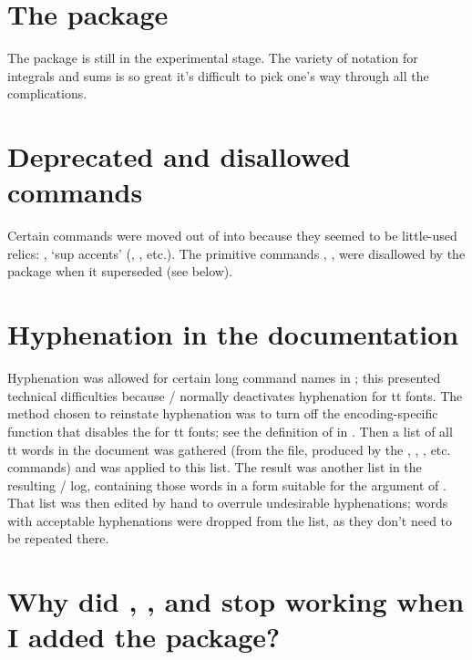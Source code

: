 \documentclass{amsdtx}
\begin{document}
\section{The  package}

The  package is still in the experimental stage. The
variety of notation for integrals and sums is so great it's difficult to
pick one's way through all the complications.

\section{Deprecated and disallowed commands}

Certain commands were moved out of  into 
because they seemed to be little-used relics:
, `sup accents' (, , etc.). The
primitive commands , ,  were disallowed by
the  package when it superseded  (see below).

\section{Hyphenation in the documentation}

Hyphenation was allowed for certain long command names in
; this presented technical difficulties because \latex/
normally deactivates hyphenation for tt fonts. The method chosen to
reinstate hyphenation was to turn off the encoding-specific function
 that disables the  for tt fonts; see the
definition of  in . Then a list of all
tt words in the document was gathered (from the  file, produced
by the , , , etc. commands) and 
was applied to this list. The result was another list in the resulting
\tex/ log, containing those words in a form suitable for the argument of
. That list was then edited by hand to overrule
undesirable hyphenations; words with acceptable hyphenations were
dropped from the list, as they don't need to be repeated there.

\section{Why did , , and  stop working
when I added the  package?}
\end{document}
